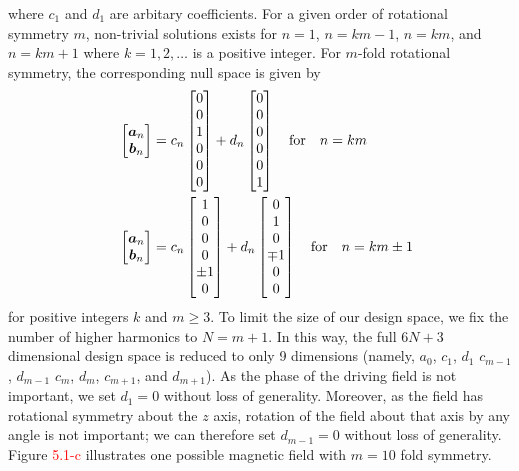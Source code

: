 where $c_1$ and $d_1$ are arbitary coefficients. For a given order of rotational symmetry $m$, non-trivial solutions exists for $n=1$, $n=k m-1$, $n=k m$, and $n=k m + 1$  where $k= 1,2,\dots$ is a positive integer. For $m$-fold rotational symmetry, the corresponding null space is given by
\begin{align}
    \quad \begin{bmatrix} \boldsymbol{a}_{n} \\ \boldsymbol{b}_{n} \end{bmatrix} &= c_{n} \begin{bmatrix} 0\\0\\1\\0\\0\\0 \end{bmatrix} + d_{n} \begin{bmatrix} 0\\0\\0\\0\\0\\1 \end{bmatrix} \quad \text{for} \quad n=km
    \\
    \quad \begin{bmatrix} \boldsymbol{a}_{n} \\ \boldsymbol{b}_{n} \end{bmatrix} &= c_{n} \begin{bmatrix} 1\\0\\0\\0\\\pm1\\0 \end{bmatrix} + d_{n} \begin{bmatrix} 0\\1\\0\\\mp1\\0\\0 \end{bmatrix} \quad \text{for} \quad n=km \pm 1
\end{align}
for positive integers $k$ and $m\geq3$. To limit the size of our design space, we fix the number of higher harmonics to $N=m+1$. In this way, the full $6N+3$ dimensional design space is reduced to only 9 dimensions (namely, $a_0$, $c_1$, $d_1$ $c_{m-1}$, $d_{m-1}$ $c_{m}$, $d_{m}$, $c_{m+1}$, and $d_{m+1}$). As the phase of the driving field is not important, we set $d_1=0$ without loss of generality.  Moreover, as the field has rotational symmetry about the $z$ axis, rotation of the field about that axis by any angle is not important; we can therefore set $d_{m-1}=0$ without loss of generality.  Figure \textcolor{red}{5.1-c} illustrates one possible magnetic field with $m=10$ fold symmetry.

